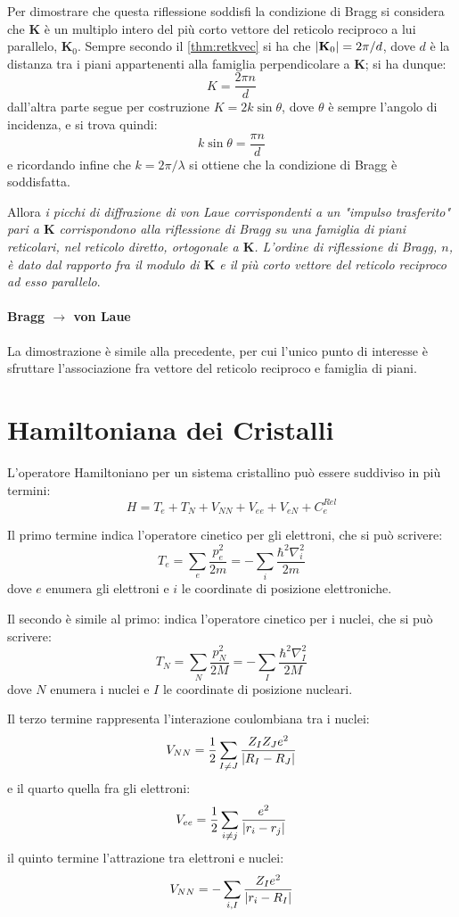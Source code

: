 Per dimostrare che questa riflessione soddisfi la condizione di Bragg si considera che $ \textbf{K} $ è un multiplo intero del più corto vettore del reticolo reciproco a lui parallelo, $ \textbf{K}_0 $.
Sempre secondo il \cref{thm:retkvec} si ha che $ \abs{\textbf{K}_0} = 2\pi/d $, dove $ d $ è la distanza tra i piani appartenenti alla famiglia perpendicolare a $ \textbf{K} $; si ha dunque:
\[ K = \frac{2\pi n}{d} \]
dall'altra parte segue per costruzione $ K = 2k \sin\theta $, dove $ \theta $ è sempre l'angolo di incidenza, e si trova quindi:
\[ k\sin\theta = \frac{\pi n}{d} \]
e ricordando infine che $ k = 2\pi/\lambda $ si ottiene che la condizione di Bragg è soddisfatta.

Allora \textit{i picchi di diffrazione di von Laue corrispondenti a un "impulso trasferito" pari a $ \textbf{K} $ corrispondono alla riflessione di Bragg su una famiglia di piani reticolari, nel reticolo diretto, ortogonale a $ \textbf{K} $. L'ordine di riflessione di Bragg, $ n $, è dato dal rapporto fra il modulo di $ \textbf{K} $ e il più corto vettore del reticolo reciproco ad esso parallelo}.

\paragraph{Bragg $ \rightarrow $ von Laue} La dimostrazione è simile alla precedente, per cui l'unico punto di interesse è sfruttare l'associazione fra vettore del reticolo reciproco e famiglia di piani.

\section{Hamiltoniana dei Cristalli}

L'operatore Hamiltoniano per un sistema cristallino può essere suddiviso in più termini:
\[ H = T_e + T_N + V_{NN} + V_{ee} + V_{eN} + C_e^{Rel} \]

Il primo termine indica l'operatore cinetico per gli elettroni, che si può scrivere:
\[ T_e = \sum_e \frac{p_e^2}{2m} = - \sum_i \frac{\hbar^2\nabla_i^2}{2m}\]
dove $ e $ enumera gli elettroni e $ i $ le coordinate di posizione elettroniche.

Il secondo è simile al primo: indica l'operatore cinetico per i nuclei, che si può scrivere:
\[ T_N = \sum_N \frac{p_N^2}{2M} = - \sum_I \frac{\hbar^2\nabla_I^2}{2M}\]
dove $ N $ enumera i nuclei e $ I $ le coordinate di posizione nucleari.

Il terzo termine rappresenta l'interazione coulombiana tra i nuclei:
\[ V_{NN} = \frac{1}{2} \sum_{I \neq J} \frac{Z_I Z_J e^2}{\abs{R_I - R_J}}\]
e il quarto quella fra gli elettroni:
\[ V_{ee} = \frac{1}{2} \sum_{i \neq j} \frac{e^2}{\abs{r_i - r_j}}\]
il quinto termine l'attrazione tra elettroni e nuclei:
\[ V_{NN} = - \sum_{i,I} \frac{Z_I e^2}{\abs{r_i - R_I}}\]

